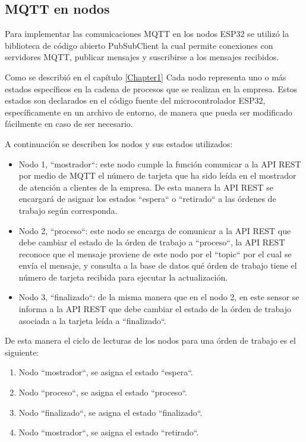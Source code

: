 \subsection{MQTT en nodos}
\label{subsec:mqttnodos}
Para implementar las comunicaciones MQTT en los nodos ESP32 se utilizó la biblioteca de código abierto PubSubClient \citep{WEBSITE:pubsubclient} la cual permite conexiones con servidores MQTT, publicar mensajes y suscribirse a los mensajes recibidos.

Como se describió en el capítulo \ref{Chapter1} Cada nodo representa uno o más estados específicos en la cadena de procesos que se realizan en la empresa. Estos estados son declarados en el código fuente del microcontrolador ESP32, específicamente en un archivo de entorno, de manera que pueda ser modificado fácilmente en caso de ser necesario.

A continuación se describen los nodos y sus estados utilizados:

\begin{itemize}
\item Nodo 1, ``mostrador``: este nodo cumple la función comunicar a la API REST por medio de MQTT el número de tarjeta que ha sido leída en el mostrador de atención a clientes de la empresa. De esta manera la API REST se encargará de asignar los estados ``espera`` o ``retirado`` a las órdenes de trabajo según corresponda.

\item Nodo 2, ``proceso``: este nodo se encarga de comunicar a la API REST que debe cambiar el estado de la órden de trabajo a ``proceso``, la API REST reconoce que el mensaje proviene de este nodo por el ``topic`` por el cual se envía el mensaje, y consulta a la base de datos qué órden de trabajo tiene el número de tarjeta recibida para ejecutar la actualización.

\item Nodo 3, ``finalizado``: de la misma manera que en el nodo 2, en este sensor se informa a la API REST que debe cambiar el estado de la órden de trabajo asociada a la tarjeta leída a ``finalizado``.
\end{itemize}

De esta manera el ciclo de lecturas de los nodos para una órden de trabajo es el siguiente: 

\begin{enumerate}
\item Nodo ``mostrador``, se asigna el estado ``espera``.
\item Nodo ``proceso``, se asigna el estado ``proceso``.
\item Nodo ``finalizado``, se asigna el estado ``finalizado``.
\item Nodo ``mostrador``, se asigna el estado ``retirado``.
\end{enumerate}



